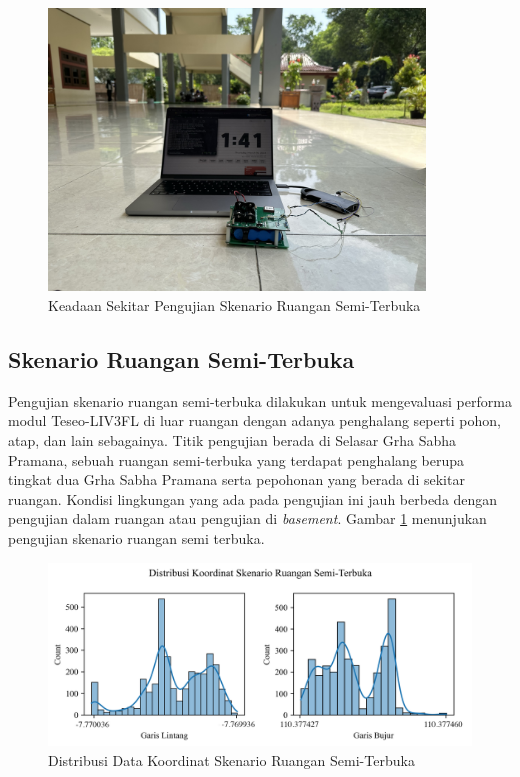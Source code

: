 \begin{figure}[H]
	\centering
	\includegraphics[width=10cm]{contents/chapter-4/3-skenario-semioutdoor/keadaan.jpeg}
	\caption{Keadaan Sekitar Pengujian Skenario Ruangan Semi-Terbuka}
	\label{Fig: semioutdoor-keadaan}
\end{figure}

\subsection{Skenario Ruangan Semi-Terbuka}
Pengujian skenario ruangan semi-terbuka dilakukan untuk mengevaluasi performa modul Teseo\hyp{}LIV3FL di luar ruangan dengan adanya penghalang seperti pohon, atap, dan lain sebagainya. Titik pengujian berada di Selasar Grha Sabha Pramana, sebuah ruangan semi-terbuka yang terdapat penghalang berupa tingkat dua Grha Sabha Pramana serta pepohonan yang berada di sekitar ruangan. Kondisi lingkungan yang ada pada pengujian ini jauh berbeda dengan pengujian dalam ruangan atau pengujian di \textit{basement}. Gambar \ref{Fig: semioutdoor-keadaan} menunjukan pengujian skenario ruangan semi terbuka.

\begin{figure}[H]
	\centering
	\begin{adjustbox}{width=\textwidth}
		\includegraphics{contents/chapter-4/3-skenario-semioutdoor/distribution.png}
	\end{adjustbox}
	\caption{Distribusi Data Koordinat Skenario Ruangan Semi-Terbuka}
	\label{Fig:semioutdoor-distribution}
\end{figure}

